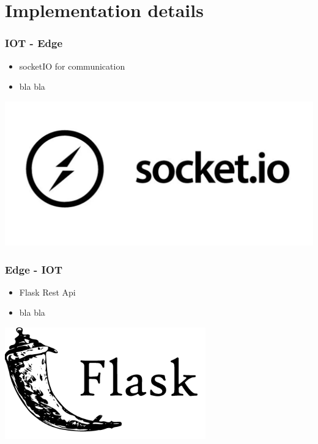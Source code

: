 \documentclass{beamer}
\begin{document}
\section{Implementation details}

\begin{frame}
\frametitle{IOT - Edge}
\begin{itemize}
    \item socketIO for communication
    \item bla bla
\end{itemize}
\includegraphics[width=1\textwidth]{./res/socket-io-logo-1.jpeg}
\end{frame}


\begin{frame}
    \frametitle{Edge - IOT}
    \begin{itemize}
        \item Flask Rest Api
        \item bla bla
    \end{itemize}
    \includegraphics[width=0.65\textwidth]{./res/flask.png}
\end{frame}
\end{document}
